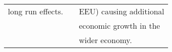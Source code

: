\begin{table}
\begin{center}
\begin{tabular}{ r l l }
long run effects.                  &                                              & EEU) causing additional   \\
                                   &                                              & economic growth in the    \\
                                   &                                              & wider economy. \\
\bottomrule
\end{tabular}
\end{center}
\end{table}
